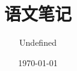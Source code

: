 \documentclass{article}
\makeatletter
\newcommand\hatabstractname{Abstract}
\newenvironment{hatabstract}{%
      \titlepage
      \null\vfil
      \@beginparpenalty\@lowpenalty
      \begin{center}%
        \bfseries \abstractname
        \@endparpenalty\@M
      \end{center}}%
     {\par\vfil\null\endtitlepage}
\newenvironment{hatabstract}{%
      \if@twocolumn
        \section*{\hatabstractname}%
      \else
        \small
        \begin{center}%
          {\bfseries \hatabstractname\vspace{-.5em}\vspace{\z@}}%
        \end{center}%
        \quotation
      \fi}
      {\if@twocolumn\else\endquotation\fi}
\makeatother
\begin{document}
\title{语文笔记}                                   %
\author{Undefined}                                 %
\date{\today}                                      %
{}                               %
\maketitle                                         %
\begin{hatabstract}                                %
\usebox{\contentofabstract}                        %
\end{hatabstract}\label{abstractformal}            %
\end{document}
